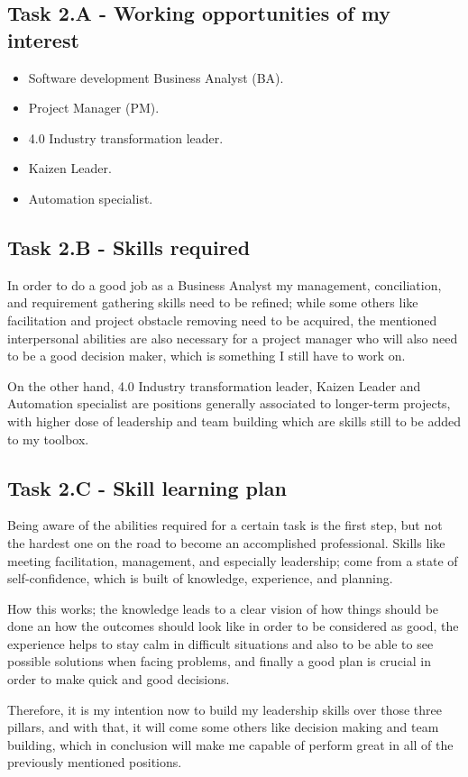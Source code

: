 \documentclass[a4paper, 12pt]{article}
\begin{document}
\subsection{Task 2.A - Working opportunities of my interest}
\begin{itemize}
\item Software development Business Analyst (BA).
\item Project Manager (PM).
\item 4.0 Industry transformation leader.
\item Kaizen Leader.
\item Automation specialist.
\end{itemize}
\subsection{Task 2.B - Skills required}

In order to do a good job as a Business Analyst my management, conciliation, and requirement gathering skills need to be refined; while some others like facilitation and project obstacle removing need to be acquired, the mentioned interpersonal abilities are also necessary for a project manager who will also need to be a good decision maker, which is something I still have to work on.

On the other hand, 4.0 Industry transformation leader, Kaizen Leader and Automation specialist are positions generally associated to longer-term projects, with higher dose of leadership and team building which are skills still to be added to my toolbox.

\subsection{Task 2.C - Skill learning plan}

Being aware of the abilities required for a certain task is the first step, but not the hardest one on the road to become an accomplished professional. Skills like meeting facilitation, management, and especially leadership; come from a state of self-confidence, which is built of knowledge, experience, and planning.

How this works; the knowledge leads to a clear vision of how things should be done an how the outcomes should look like in order to be considered as good, the experience helps to stay calm in difficult situations and also to be able to see possible solutions when facing problems, and finally a good plan is crucial in order to make quick and  good decisions.

Therefore, it is my intention now to build my leadership skills over those three pillars, and with that, it will come some others like decision making and team building, which in conclusion will make me capable of perform great in all of the previously mentioned positions.
\end{document}
